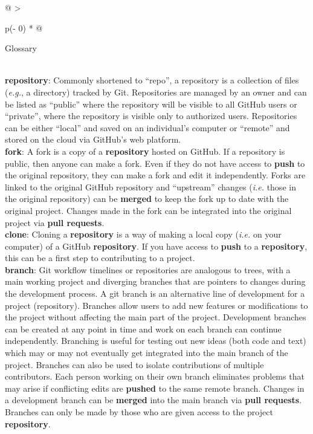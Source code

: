 \begin{tablenos:no-prefix-table-caption}

\begin{longtable}[]{@{}
  >{\raggedright\arraybackslash}p{(\columnwidth - 0\tabcolsep) * }@{}}
\toprule
\begin{minipage}[b]{\linewidth}\raggedright
Glossary
\end{minipage} \\
\midrule
\endhead
\textbf{repository}: Commonly shortened to ``repo'', a repository is a collection of files (\emph{e.g.}, a directory) tracked by Git. Repositories are managed by an owner and can be listed as ``public'' where the repository will be visible to all GitHub users or ``private'', where the repository is visible only to authorized users. Repositories can be either ``local'' and saved on an individual's computer or ``remote'' and stored on the cloud via GitHub's web platform. \\
\textbf{fork}: A fork is a copy of a \textbf{repository} hosted on GitHub. If a repository is public, then anyone can make a fork. Even if they do not have access to \textbf{push} to the original repository, they can make a fork and edit it independently. Forks are linked to the original GitHub repository and ``upstream'' changes (\emph{i.e.} those in the original repository) can be \textbf{merged} to keep the fork up to date with the original project. Changes made in the fork can be integrated into the original project via \textbf{pull requests}. \\
\textbf{clone}: Cloning a \textbf{repository} is a way of making a local copy (\emph{i.e.} on your computer) of a GitHub \textbf{repository}. If you have access to \textbf{push} to a \textbf{repository}, this can be a first step to contributing to a project. \\
\textbf{branch}: Git workflow timelines or repositories are analogous to trees, with a main working project and diverging branches that are pointers to changes during the development process. A git branch is an alternative line of development for a project (repository). Branches allow users to add new features or modifications to the project without affecting the main part of the project. Development branches can be created at any point in time and work on each branch can continue independently. Branching is useful for testing out new ideas (both code and text) which may or may not eventually get integrated into the main branch of the project. Branches can also be used to isolate contributions of multiple contributors. Each person working on their own branch eliminates problems that may arise if conflicting edits are \textbf{pushed} to the same remote branch. Changes in a development branch can be \textbf{merged} into the main branch via \textbf{pull requests}. Branches can only be made by those who are given access to the project \textbf{repository}. \\

\end{longtable}
\end{tablenos:no-prefix-table-caption}
